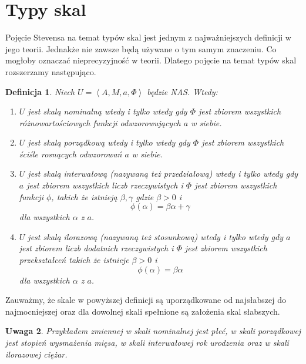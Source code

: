 \documentclass[12pt,a4paper]{report}
\newtheorem{definition}{Definicja}[chapter]
\newtheorem{przyklad}{Przykład}
\newtheorem{remark}[definition]{Uwaga}
\newcommand{\zbior}[1]{\left\lbrace {#1} \right\rbrace }
\newcommand{\tuple}[1]{\left\langle {#1} \right\rangle}
\begin{document}
\section{Typy skal}
Pojęcie Stevensa na temat typów skal jest jednym z najważniejszych definicji w jego teorii. Jednakże nie zawsze będą używane o tym samym znaczeniu. Co mogłoby oznaczać nieprecyzyjność w teorii. Dlatego pojęcie na temat typów skal rozszerzamy następująco.  
\begin{definition}
Niech $U=\tuple{A, M, a, \Phi}$ będzie NAS. Wtedy:
\begin{enumerate}
\item
$U$ jest skalą nominalną wtedy i tylko wtedy gdy $\Phi$ jest zbiorem wszystkich różnowartościowych funkcji odwzorowujących $a$ w siebie.
\item
$U$ jest skalą porządkową wtedy i tylko wtedy gdy $\Phi$ jest zbiorem wszystkich ściśle rosnących odwzorowań $a$ w siebie.
\item
$U$ jest skalą interwałową (nazywaną też przedziałową) wtedy i tylko wtedy gdy $a$ jest zbiorem wszystkich liczb rzeczywistych i $\Phi$ jest zbiorem wszystkich funkcji $\phi$, takich że istnieją $\beta,\gamma$ gdzie $\beta>0$ i
\begin{equation*}
\phi(\alpha)=\beta\alpha+\gamma
\end{equation*}
dla wszystkich $\alpha$ z $a$.
\item
$U$ jest skalą ilorazową (nazywaną też stosunkową) wtedy i tylko wtedy gdy $a$ jest zbiorem liczb dodatnich rzeczywistych i $\Phi$ jest zbiorem wszystkich przekształceń takich że istnieje $\beta>0$ i
\begin{equation*}
\phi(\alpha)=\beta\alpha
\end{equation*}
dla wszystkich $\alpha$ z $a$.
\end{enumerate}
\end{definition}

Zauważmy, że skale w powyższej definicji są uporządkowane od najsłabszej do najmocniejszej oraz dla dowolnej skali spełnione są założenia skal słabszych.
\begin{remark}
Przykładem zmiennej w skali nominalnej jest płeć, w skali porządkowej jest stopień wysmażenia mięsa, w skali interwałowej rok urodzenia oraz w skali ilorazowej ciężar.
\end{remark}

\end{document}
